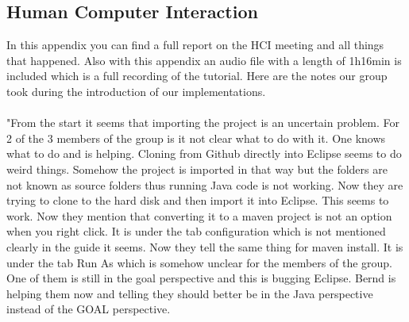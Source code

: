 \documentclass[11pt]{article}
\begin{document}
\begin{appendices}
	\section{Human Computer Interaction}
	In this appendix you can find a full report on the \gls{HCI} meeting and all things that happened. Also with this appendix an audio file with a length of 1h16min is included which is a full recording of the tutorial. Here are the notes our group took during the introduction of our implementations.\\
	\\
	"From the start it seems that importing the project is an uncertain problem. For 2 of the 3 members of the group is it not clear what to do with it. One knows what to do and is helping. Cloning from Github\cite{GitHub} directly into Eclipse seems to do weird things. Somehow the project is imported in that way but the folders are not known as source folders thus running Java code is not working. Now they are trying to clone to the hard disk and then import it into Eclipse. This seems to work. Now they mention that converting it to a maven project is not an option when you right click. It is under the tab configuration which is not mentioned clearly in the guide it seems. Now they tell the same thing for maven install. It is under the tab Run As which is somehow unclear for the members of the group. One of them is still in the goal perspective and this is bugging Eclipse. Bernd is helping them now and telling they should better be in the Java perspective instead of the GOAL perspective.\par 

\end{appendices}
\end{document}
